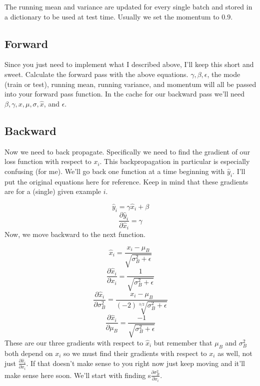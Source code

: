 \documentclass[12pt]{article}
\begin{document}
The running mean and variance are updated for every single batch and stored in a dictionary to 
be used at test time. Usually we set the momentum to 0.9.

\subsection{Forward}
Since you just need to implement what I described above, I'll keep this short and sweet. 
Calculate the forward pass with the above equations. $\gamma, \beta, \epsilon$, the mode 
(train or test), running mean, running variance, and momentum will all be passed into your 
forward pass function. In the cache for our backward pass we'll need $\beta, \gamma, x, \mu, 
\sigma, \hat{x}$, and $\epsilon$. 

\subsection{Backward}
Now we need to back propagate. Specifically we need to find the gradient of our loss function with 
respect to $x_i$. This backpropagation in particular is especially confusing (for me). We'll go back 
one function at a time beginning with $\hat{y}_i$. I'll put the original equations here for reference. 
Keep in mind that these gradients are for a (single) given example $i$. 

\begin{equation*}
    \hat{y}_i = \gamma \hat{x}_i + \beta
\end{equation*}
\begin{equation*}
    \frac{\partial \hat{y}_i}{\partial \hat{x}_i} = \gamma
\end{equation*}
Now, we move backward to the next function. 

\begin{equation*}
    \hat{x}_i = \frac{x_i - \mu_B}{\sqrt{\sigma_B^2 + \epsilon}}
\end{equation*}
\begin{equation*}
    \frac{\partial \hat{x}_i}{\partial x_i} = \frac{1}{\sqrt{\sigma_B^2 + \epsilon}}
\end{equation*}
\begin{equation*}
    \frac{\partial \hat{x}_i}{\partial \sigma_B^2} = 
    \frac{x_i - \mu_B}{(-2) \sqrt[3/2]{\sigma_B^2 + \epsilon}}
\end{equation*}
\begin{equation*}
    \frac{\partial \hat{x}_i}{\partial \mu_B} = \frac{-1}{\sqrt{\sigma_B^2 + \epsilon}}
\end{equation*}
These are our three gradients with respect to $\hat{x}_i$ but remember that $\mu_B$ and 
$\sigma_B^2$ both depend on $x_i$ so we must find their gradients with respect to $x_i$ as 
well, not just $\frac{\partial \hat{x}_i}{\partial x_i}$. If that doesn't make sense 
to you right now just keep moving and it'll make sense here soon. We'll start with 
finding s$\frac{\partial \sigma_B^2}{\partial x_i}$. 
\end{document}
